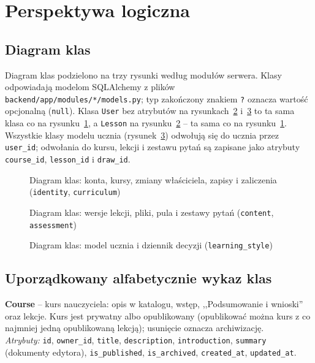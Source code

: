 \section{Perspektywa logiczna}

\subsection{Diagram klas}

Diagram klas podzielono na trzy rysunki według modułów serwera. Klasy odpowiadają modelom SQLAlchemy z plików \nolinkurl{backend/app/modules/*/models.py}; typ zakończony znakiem \texttt{?} oznacza wartość opcjonalną (\texttt{null}). Klasa \texttt{User} bez atrybutów na rysunkach~\ref{fig:classes-content} i~\ref{fig:classes-student} to ta sama klasa co na rysunku~\ref{fig:classes-courses}, a \texttt{Lesson} na rysunku~\ref{fig:classes-content} -- ta sama co na rysunku~\ref{fig:classes-courses}. Wszystkie klasy modelu ucznia (rysunek~\ref{fig:classes-student}) odwołują się do ucznia przez \texttt{user\_id}; odwołania do kursu, lekcji i zestawu pytań są zapisane jako atrybuty \texttt{course\_id}, \texttt{lesson\_id} i \texttt{draw\_id}.

\begin{figure}[H]
    \centering
    
    \caption{Diagram klas: konta, kursy, zmiany właściciela, zapisy i zaliczenia (\texttt{identity}, \texttt{curriculum})}
    \label{fig:classes-courses}
\end{figure}

\begin{figure}[H]
    \centering
    
    \caption{Diagram klas: wersje lekcji, pliki, pula i zestawy pytań (\texttt{content}, \texttt{assessment})}
    \label{fig:classes-content}
\end{figure}

\begin{figure}[H]
    \centering
    
    \caption{Diagram klas: model ucznia i dziennik decyzji (\texttt{learning\_style})}
    \label{fig:classes-student}
\end{figure}

\subsection{Uporządkowany alfabetycznie wykaz klas}

\textbf{Course} -- kurs nauczyciela: opis w katalogu, wstęp, ,,Podsumowanie i wnioski'' oraz lekcje. Kurs jest prywatny albo opublikowany (opublikować można kurs z co najmniej jedną opublikowaną lekcją); usunięcie oznacza archiwizację. \\
\textit{Atrybuty:} \texttt{id}, \texttt{owner\_id}, \texttt{title}, \texttt{description}, \texttt{introduction}, \texttt{summary} (dokumenty edytora), \texttt{is\_published}, \texttt{is\_archived}, \texttt{created\_at}, \texttt{updated\_at}.

